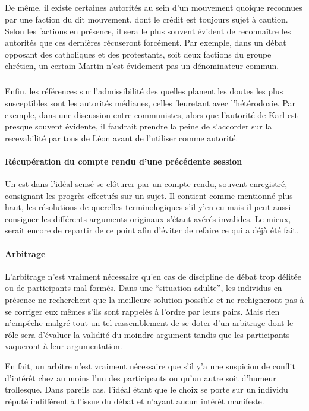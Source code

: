 \subparagraph{}
De même, il existe certaines autorités au sein d’un mouvement quoique reconnues par une faction du dit mouvement, dont le crédit est toujours sujet à caution. Selon les factions en présence, il sera le plus souvent évident de reconnaître les autorités que ces dernières récuseront forcément. Par exemple, dans un débat opposant des catholiques et des protestants, soit deux factions du groupe chrétien, un certain Martin  n’est évidement pas un dénominateur commun.

\subparagraph{}
Enfin, les références sur l’admissibilité des quelles planent les doutes les plus susceptibles sont les autorités médianes, celles fleuretant avec l’hétérodoxie. Par exemple, dans une discussion entre communistes, alors que l’autorité de Karl  est presque souvent évidente, il faudrait prendre la peine de s’accorder sur la recevabilité par tous de Léon  avant de l’utiliser comme autorité.

\paragraph{Récupération du compte rendu d’une précédente session} Un \mainabbr{} est dans l’idéal sensé se clôturer par un compte rendu, souvent enregistré, consignant les progrès effectués sur un sujet. Il contient comme mentionné plus haut, les résolutions de querelles terminologiques s’il y’en eu mais il peut aussi consigner les différents arguments originaux s’étant avérés invalides. Le mieux, serait encore de repartir de ce point afin d’éviter de refaire ce qui a déjà été fait.

\paragraph{Arbitrage} L’arbitrage n’est vraiment nécessaire qu’en cas de discipline de débat trop délitée ou de participants mal formés. Dans une \enquote{situation adulte}, les individus en présence ne recherchent que la meilleure solution possible et ne rechigneront pas à se corriger eux mêmes s’ils sont rappelés à l’ordre par leurs pairs. Mais rien n’empêche malgré tout un tel rassemblement de se doter d’un arbitrage dont le rôle sera d’évaluer la validité du moindre argument tandis que les participants vaqueront à leur argumentation.

En fait, un arbitre n’est vraiment nécessaire que s’il y’a une suspicion de conflit d’intérêt chez au moins l’un des participants ou qu’un autre soit d’humeur trollesque. Dans pareils cas, l’idéal étant que le choix se porte sur un individu réputé indifférent à l’issue du débat et n’ayant aucun intérêt manifeste.

